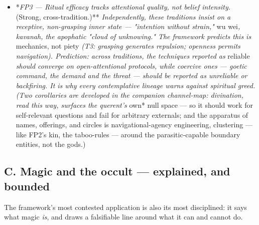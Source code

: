 \documentclass[11pt]{article}
\begin{document}
\begin{itemize}
\item *\emph{FP3 --- Ritual efficacy tracks attentional quality, not belief intensity. }(Strong, cross-tradition.)**\emph{ Independently, these traditions insist on a receptive, non-grasping inner state --- "intention without strain," }wu wei\emph{, kavanah, the apophatic "cloud of unknowing." The framework predicts this is }mechanics, not piety\emph{ (T3: grasping generates repulsion; openness permits navigation). Prediction: across traditions, the techniques reported as }reliable\emph{ should converge on open-attentional protocols, while coercive ones --- goetic command, the demand and the threat --- should be reported as unreliable or backfiring. It is why every contemplative lineage warns against spiritual greed. (Two corollaries are developed in the companion channel-map: divination, read this way, surfaces the querent's }own* null space --- so it should work for self-relevant questions and fail for arbitrary externals; and the apparatus of names, offerings, and circles is navigational-agency engineering, clustering --- like FP2's kin, the taboo-rules --- around the parasitic-capable boundary entities, not the gods.)
\end{itemize}

\subsection*{C. Magic and the occult --- explained, and bounded}
The framework's most contested application is also its most disciplined: it says what magic \emph{is}, and draws a falsifiable line around what it can and cannot do.
\end{document}
